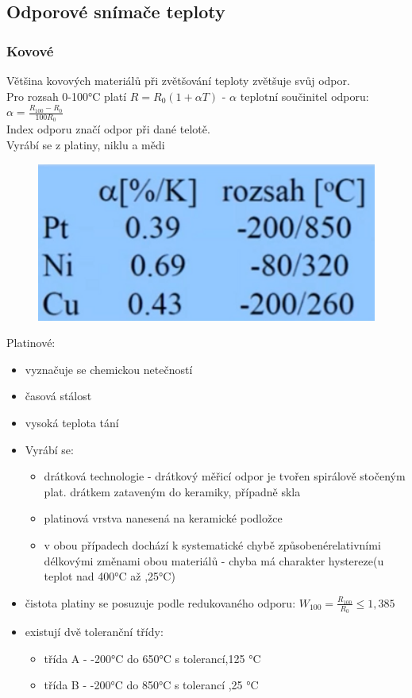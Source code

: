 \subsection*{Odporové snímače teploty}
\subsubsection*{Kovové}
Většina kovových materiálů při zvětšování teploty zvětšuje svůj odpor.\\    
Pro rozsah 0-100°C platí $R = R_0(1+\alpha T)$ - $\alpha$ teplotní součinitel odporu: $\alpha = \frac{R_100-R_0}{100R_0}$\\
Index odporu značí odpor při dané telotě.\\
Vyrábí se z platiny, niklu a mědi\\
\begin{figure}[H]
    \includegraphics*[scale = 0.2]{img/odporoveSnimace.png}
\end{figure}
 Platinové:
 \begin{itemize}
    \item vyznačuje se chemickou netečností
    \item časová stálost
    \item vysoká teplota tání
    \item Vyrábí se:
    \begin{itemize}
        \item drátková technologie - drátkový měřicí odpor je tvořen spirálově stočeným plat. drátkem zataveným do keramiky, případně skla
        \item platinová vrstva nanesená na keramické podložce 
        \item v obou případech dochází k systematické chybě  způsobenérelativními délkovými změnami obou materiálů - chyba má charakter hystereze(u teplot nad 400°C až ,25°C)
    \end{itemize}
    \item čistota platiny se posuzuje podle redukovaného odporu: $W_{100} = \frac{R_{100}}{R_0} \leq 1,385$
    \item existují dvě toleranční třídy:
    \begin{itemize}
        \item třída A - -200°C do 650°C s tolerancí,125 °C 
        \item třída B - -200°C do 850°C s tolerancí ,25 °C 
    \end{itemize}
 \end{itemize}
